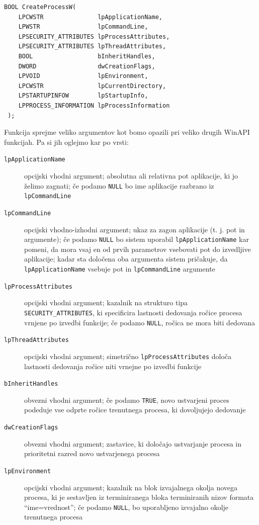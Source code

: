 \documentclass[a4paper,12pt,openright]{book}
\begin{document}
\begin{lstlisting}[style=func]
 BOOL CreateProcessW(
	LPCWSTR               lpApplicationName,
	LPWSTR                lpCommandLine,
	LPSECURITY_ATTRIBUTES lpProcessAttributes,
	LPSECURITY_ATTRIBUTES lpThreadAttributes,
	BOOL                  bInheritHandles,
	DWORD                 dwCreationFlags,
	LPVOID                lpEnvironment,
	LPCWSTR               lpCurrentDirectory,
	LPSTARTUPINFOW        lpStartupInfo,
	LPPROCESS_INFORMATION lpProcessInformation
 );
\end{lstlisting}

Funkcija sprejme veliko argumentov kot bomo opazili pri veliko drugih WinAPI funkcijah.
Pa si jih oglejmo kar po vrsti:
\begin{description}
	\item[\texttt{lpApplicationName}] opcijski vhodni argument; absolutna ali relativna pot aplikacije, ki jo želimo zagnati; če podamo \texttt{NULL} bo ime aplikacije razbrano iz \texttt{lpCommandLine}
	\item[\texttt{lpCommandLine}] opcijski vhodno-izhodni argument; ukaz za zagon aplikacije (t. j. pot in argumente); če podamo \texttt{NULL} bo sistem uporabil \texttt{lpApplicationName} kar pomeni, da mora vsaj en od prvih parametrov vsebovati pot do izvedljive aplikacije; kadar sta določena oba argumenta sistem pričakuje, da \texttt{lpApplicationName} vsebuje pot in \texttt{lpCommandLine} argumente
	\item[\texttt{lpProcessAttributes}] opcijski vhodni argument; kazalnik na strukturo tipa \texttt{SECURITY\_ATTRIBUTES}, ki specificira lastnosti dedovanja ročice procesa vrnjene po izvedbi funkcije; če podamo \texttt{NULL}, ročica ne mora biti dedovana
	\item[\texttt{lpThreadAttributes}] opcijski vhodni argument; simetrično \texttt{lpProcessAttributes} določa lastnosti dedovanja ročice niti vrnejne po izvedbi funkcije
	\item[\texttt{bInheritHandles}] obvezni vhodni argument; če podamo \texttt{TRUE}, novo ustvarjeni proces podeduje vse odprte ročice trenutnega procesa, ki dovoljujejo dedovanje
	\item[\texttt{dwCreationFlags}] obvezni vhodni argument; zastavice, ki določajo ustvarjanje procesa in prioritetni razred novo ustvarjenega procesa
	\item[\texttt{lpEnvironment}] opcijski vhodni argument; kazalnik na blok izvajalnega okolja novega procesa, ki je sestavljen iz terminiranega bloka terminiranih nizov formata ``ime=vrednost''; če podamo \texttt{NULL}, bo uporabljeno izvajalno okolje trenutnega procesa

\end{description}
\end{document}
